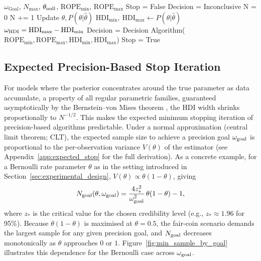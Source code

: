 \begin{algorithm}
    \caption{Decisive Precision is the Goal (highlighted: the stopping condition)}\label{alg:dpitg}
    \begin{algorithmic}
    \Require $\omega_\mathrm{Goal}$, $N_\mathrm{max}$, $\theta_{\rm null}$, $\mathrm{ROPE}_\mathrm{min}$, $\mathrm{ROPE}_\mathrm{max}$
    \State Stop = False
    \State Decision = Inconclusive
    \State N = 0
    \State N += 1 
    \State Update $\hat\theta, P(\theta|\hat\theta)$ 
    \State $\mathrm{HDI}_\mathrm{min}, \ \mathrm{HDI}_\mathrm{max}  \gets P(\theta|\hat\theta)$ 
    \State $\omega_{\rm HDI} = \mathrm{HDI}_\mathrm{max} - \mathrm{HDI}_\mathrm{min}$
        \State Decision = Decision Algorithm($\mathrm{ROPE}_\mathrm{min}, \mathrm{ROPE}_\mathrm{max}, \mathrm{HDI}_\mathrm{min}, \mathrm{HDI}_\mathrm{max}$) 
            \State \HiLi Stop = True 
        \EndIf
    \EndIf
    \EndWhile
    \end{algorithmic}
\end{algorithm}

\subsection{Expected Precision-Based Stop Iteration}\label{sec:expected_stop_iteration}

For models where the posterior concentrates around the true parameter as data accumulate,
a property of all regular parametric families, guaranteed asymptotically by the
Bernstein--von Mises theorem \citep{vandervaart1998}, the HDI width shrinks
proportionally to $N^{-1/2}$.
This makes the expected minimum stopping iteration of precision-based algorithms predictable.
Under a normal approximation (central limit theorem; CLT), the expected sample size to achieve a precision goal
$\omega_{\rm goal}$ is proportional to the per-observation variance $V(\theta)$ of the
estimator (see Appendix~\ref{app:expected_stop} for the full derivation).
As a concrete example, for a Bernoulli rate parameter $\theta$ as in the setting introduced
in Section~\ref{sec:experimental_design}, $V(\theta) \propto \theta(1-\theta)$, giving
\begin{equation}\label{eq:pitg_stop_iteration}
N_{\rm goal}(\theta,\omega_{\rm goal}) = \frac{4 z_{*}^{2}}{\omega_{\rm goal}^{2}}\,\theta(1-\theta) - 1,
\end{equation}
where $z_{*}$ is the critical value for the chosen credibility level (e.g.,
$z_{*}\approx 1.96$ for 95\%). 
Because $\theta(1-\theta)$ is maximised at $\theta=0.5$, the fair-coin scenario demands
the largest sample for any given precision goal, and $N_{\rm goal}$ decreases monotonically
as $\theta$ approaches $0$ or $1$.
Figure~\ref{fig:min_sample_by_goal} illustrates this dependence
for the Bernoulli case across $\omega_{\rm goal}$.

